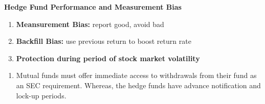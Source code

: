 \documentclass[11pt,fleqn]{book} %
\numberwithin{equation}{section} %
\numberwithin{figure}{section} %
\numberwithin{table}{section} %
\begin{document}
\begin{definition}\textbf{Hedge Fund Performance and Measurement Bias}
\begin{enumerate}
    \item \textbf{Meansurement Bias:} report good, avoid bad
    \item \textbf{Backfill Bias:} use previous return to boost return rate
    \item \textbf{Protection during period of stock market volatility}
\end{enumerate}
\end{definition}
\begin{remark}
\begin{enumerate}
    \item Mutual funds must offer immediate access to withdrawals from their fund as an SEC requirement. Whereas, the hedge funds have advance notification and lock-up periods.
\end{enumerate}
\end{remark}

\end{document}
